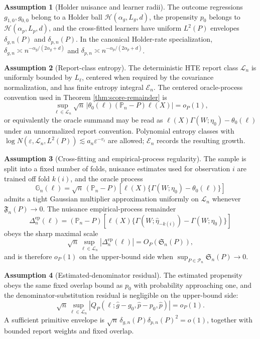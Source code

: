 \documentclass[11pt]{article}
\theoremstyle{definition}
\newtheorem{assumption}{Assumption}
\theoremstyle{plain}
\theoremstyle{remark}
\begin{document}
\begin{assumption}[Holder nuisance and learner radii]\label{ass:holder}
The outcome regressions \(g_{1,0},g_{0,0}\) belong to a Holder ball
\(\mathcal{H}(\alpha_g,L_g,d)\), the propensity \(p_0\) belongs to
\(\mathcal{H}(\alpha_p,L_p,d)\), and the cross-fitted learners have uniform
\(L^2(P)\) envelopes \(\delta_{g,n}(P)\) and \(\delta_{p,n}(P)\).  In the
canonical Holder-rate specialization,
\(\delta_{g,n}\asymp n^{-\alpha_g/(2\alpha_g+d)}\) and
\(\delta_{p,n}\asymp n^{-\alpha_p/(2\alpha_p+d)}\).
\end{assumption}

\begin{assumption}[Report-class entropy]\label{ass:entropy}
The deterministic HTE report class \(\mathcal{L}_n\) is uniformly bounded by
\(L_\ell\), centered when required by the covariance normalization, and has
finite entropy integral \(\mathcal{E}_n\).  The centered oracle-process
convention used in Theorem \ref{thm:score-remainder} is
\[
\sup_{\ell\in\mathcal{L}_n}
\sqrt n\,|\theta_0(\ell)(\mathbb{P}_n-P)\ell(X)|=o_P(1),
\]
or equivalently the oracle summand may be read as
\(\ell(X)\Gamma(W;\eta_0)-\theta_0(\ell)\) under an unnormalized report
convention.  Polynomial entropy classes with
\(\log N(\varepsilon,\mathcal{L}_n,L^2(P))\lesssim a_n\varepsilon^{-v_\ell}\)
are allowed; \(\mathcal{E}_n\) records the resulting growth.
\end{assumption}

\begin{assumption}[Cross-fitting and empirical-process regularity]\label{ass:crossfit}
The sample is split into a fixed number of folds, nuisance estimates used for
observation \(i\) are trained off fold \(k(i)\), and the oracle process
\[
\mathbb{G}_n(\ell)=
\sqrt n\,(\mathbb{P}_n-P)[\ell(X)\{\Gamma(W;\eta_0)-\theta_0(\ell)\}]
\]
admits a tight Gaussian multiplier approximation uniformly on
\(\mathcal{L}_n\) whenever \(\mathfrak{F}_n(P)\to0\).  The nuisance
empirical-process remainder
\[
\Delta^{\mathrm{ep}}_n(\ell)=
(\mathbb{P}_n-P)[
\ell(X)\{\Gamma(W;\hat\eta_{-k(i)})-\Gamma(W;\eta_0)\}]
\]
obeys the sharp maximal scale
\[
\sqrt n\sup_{\ell\in\mathcal{L}_n}
|\Delta^{\mathrm{ep}}_n(\ell)|=O_P(\mathfrak{S}_n(P)),
\]
and is therefore \(o_P(1)\) on the upper-bound side when
\(\sup_{P\in\mathcal{P}_n}\mathfrak{S}_n(P)\to0\).
\end{assumption}

\begin{assumption}[Estimated-denominator residual]\label{ass:denominator}
The estimated propensity obeys the same fixed overlap bound as \(p_0\) with
probability approaching one, and the denominator-substitution residual is
negligible on the upper-bound side:
\[
\sqrt n\sup_{\ell\in\mathcal{L}_n}
\left|Q_P(\ell;\hat g-g_0,\hat p-p_0,\hat p)\right|=o_P(1).
\]
A sufficient primitive envelope is
\(\sqrt n\,\delta_{g,n}(P)\delta_{p,n}(P)^2=o(1)\), together with bounded
report weights and fixed overlap.
\end{assumption}
\end{document}
